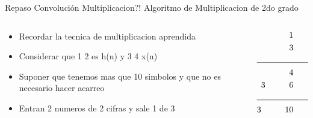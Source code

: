 \begin{frame}{Repaso Convolución }{Multiplicacion?!}
   Algoritmo de Multiplicacion de 2do grado
   \begin{columns}[c]
      \begin{column}{0.4\textwidth}
      \begin{itemize}
         \item{Recordar la tecnica de multiplicacion aprendida}
         \item{Considerar que 1 2 es h(n) y 3 4 x(n)}
         \item{Suponer que tenemos mas que 10 simbolos y que no es necesario hacer acarreo}
         \item{Entran 2 numeros de 2 cifras y sale 1 de 3}
      \end{itemize}
      \end{column}
      \hspace{2pt}
      \vrule
      \hspace{2pt}
      \begin{column}{0.6\textwidth}
         \begin{align*}
            1\hspace{1cm} 2\\
            3\hspace{1cm} 4 \\
            \cline{1-2}
            4 \hspace{1cm} 8 \\
            3 \hspace{1cm} 6 \hspace{1cm}0 \\
            \cline{1-2}
            3 \hspace{1cm} 10 \hspace{1cm} 8\\
   \end{align*}
      \end{column}
   \end{columns}
   \vfill
\end{frame}
